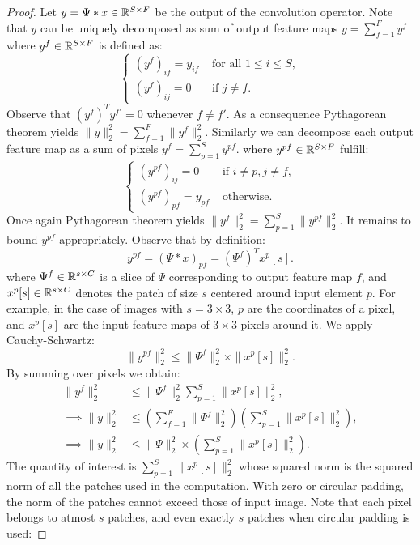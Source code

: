     \begin{proof}
        Let $y=\Psi*x\in\mathbb{R}^{S\times F}$ be the output of the convolution operator.  
        Note that $y$ can be uniquely decomposed as sum of output feature maps $y = \sum_{f=1}^F y^f$
        where $y^f\in\mathbb{R}^{S\times F}$ is defined as:
            \[
            \begin{cases}
                (y^f)_{if} = y_{if} & \text{ for all } 1\leq i\leq S,\\
                (y^f)_{ij} = 0 & \text{ if } j\neq f.
            \end{cases}
            \]
        Observe that $(y^f)^Ty^{f'}=0$ whenever $f\neq f'$. As a consequence Pythagorean theorem yields $\|y\|^2_2 = \sum_{f=1}^F \|y^f\|_2^2$.
        Similarly we can decompose each output feature map as a sum of pixels $y^f = \sum_{p=1}^S y^{pf}$.
        where $y^{pf}\in\mathbb{R}^{S\times F}$ fulfill:
            \[
            \begin{cases}
                (y^{pf})_{ij} = 0&\text{ if } i\neq p, j\neq f,\\
                (y^{pf})_{pf} = y_{pf}&\text{ otherwise.}
            \end{cases}
            \]
        Once again Pythagorean theorem yields $\|y^f\|^2_2 = \sum_{p=1}^S \|y^{pf}\|_2^2$.
        It remains to bound $y^{pf}$ appropriately. Observe that by definition:
            $$y^{pf}=(\Psi*x)_{pf}=(\Psi^f)^T x^p[s].$$
        where $\Psi^f\in\mathbb{R}^{s\times C}$ is a slice of $\Psi$ corresponding to output feature map $f$, and $x^p[s]\in\mathbb{R}^{s\times C}$ denotes the patch of size $s$ centered around input element $p$. For example, in the case of images with $s=3\times 3$, $p$ are the coordinates of a pixel, and $x^p[s]$ are the input feature maps of $3\times 3$ pixels around it.  
        We apply Cauchy-Schwartz:
            $$\|y^{pf}\|_2^2 \leq \|\Psi^f\|^2_2\times \|x^p[s]\|^2_2.$$
        By summing over pixels we obtain:
            \begin{align}
                \|y^f\|^2_2 &\leq \|\Psi^f\|^2_2\sum_{p=1}^S \|x^p[s]\|^2_2,\\
                \implies\|y\|^2_2 &\leq (\sum_{f=1}^F\|\Psi^f\|^2_2)(\sum_{p=1}^S \|x^p[s]\|^2_2),\\
                \implies\|y\|^2_2 &\leq \|\Psi\|^2_2\times \left(\sum_{p=1}^S \|x^p[s]\|^2_2\right).
            \end{align}
        The quantity of interest is $\sum_{p=1}^S \|x^p[s]\|^2_2$ whose squared norm is the squared norm of all the patches used in the computation. With zero or circular padding, the norm of the patches cannot exceed those of input image. Note that each pixel belongs to atmost $s$ patches, and even exactly $s$ patches when circular padding is used:

\end{proof}
